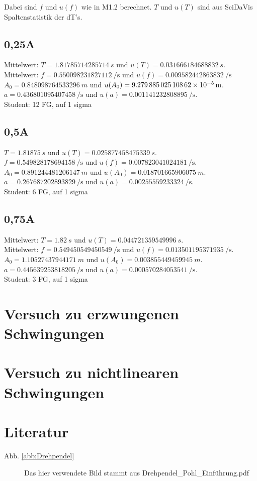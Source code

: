 \documentclass[11pt,a4paper,titlepage, ngerman]{article}
\newcommand{\refabb}[1]{Abb. \ref{abb:#1}}
\begin{document}
		Dabei sind $f$ und $u(f)$ wie in M1.2 berechnet. $T$ und $u(T)$ sind aus SciDaVis Spaltenstatistik der dT's.
		
		\subsection*{0,25A}
		Mittelwert: $T = \SI{1,81785714285714}{s}$ und $u(T) = \SI{0,031666184688832}{s}$.\\
		Mittelwert: $f = \SI{0,550098231827112}{\per\second}$ und $u(f) = \SI{0,009582442863832}{\per\second}$\\
		$A_0 = \SI{0,848098764533296}{m}$ und $u(A_0) = \SI{9,27988502510862E-05}{m}$.\\
		$a = \SI{0,436801095407458}{\per\second}$ und $u(a) = \SI{0,001141232808895}{\per\second}$.\\
		Student: 12 FG, auf 1 sigma
		
		\subsection*{0,5A}
		$T = \SI{1,81875}{s}$ und $u(T) = \SI{0,025877458475339}{s}$.\\
		$f = \SI{0,549828178694158}{\per\second}$ und $u(f) = \SI{0,007823041024181}{\per\second}$.\\
		$A_0 = \SI{0,891244481206147}{m}$ und $u(A_0) = \SI{0,018701665906075}{m}$.\\
		$a = \SI{0,267687202893829}{\per\second}$ und $u(a) = \SI{0,00255559233324}{\per\second}$.\\
		Student: 6 FG, auf 1 sigma
			
		
		\subsection*{0,75A}
		Mittelwert: $T = \SI{1,82}{s}$ und $u(T) = \SI{0,044721359549996}{s}$.\\
		Mittelwert: $f = \SI{0,549450549450549}{\per\second}$ und $u(f) = \SI{0,013501195371935}{\per\second}$.\\
		$A_0 = \SI{1,10527437944171}{m}$ und $u(A_0) = \SI{0,003855449459945}{m}$.\\
		$a = \SI{0,445639253818205}{\per\second}$ und $u(a) = \SI{0,000570284053541}{\per\second}$.\\
		Student: 3 FG, auf 1 sigma
		
		
	\section{Versuch zu erzwungenen Schwingungen}
			
	\section{Versuch zu nichtlinearen Schwingungen}

	\newpage			
	\section*{Literatur}
		\begin{description}
			\item[\refabb{Drehpendel}] Das hier verwendete Bild stammt aus \glqq Drehpendel\_Pohl\_Einführung.pdf\grqq
		\end{description}
\end{document}
